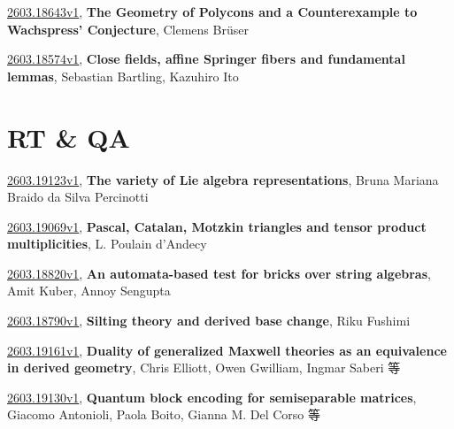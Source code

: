 \documentclass[9pt, a4paper]{article}
\theoremstyle{plain}
\theoremstyle{definition}
\theoremstyle{remark}
\newcommand{\arxiv}[3]{\href{https://arxiv.org/abs/#1}{#1}, \textbf{\textcolor{arxivblue}{#2}}, #3}
\begin{document}
\arxiv{2603.18643v1}{The Geometry of Polycons and a Counterexample to Wachspress' Conjecture}{Clemens Brüser}

\arxiv{2603.18574v1}{Close fields, affine Springer fibers and fundamental lemmas}{Sebastian Bartling, Kazuhiro Ito}


\section{RT \& QA}
\arxiv{2603.19123v1}{The variety of Lie algebra representations}{Bruna Mariana Braido da Silva Percinotti}

\arxiv{2603.19069v1}{Pascal, Catalan, Motzkin triangles and tensor product multiplicities}{L. Poulain d'Andecy}

\arxiv{2603.18820v1}{An automata-based test for bricks over string algebras}{Amit Kuber, Annoy Sengupta}

\arxiv{2603.18790v1}{Silting theory and derived base change}{Riku Fushimi}

\arxiv{2603.19161v1}{Duality of generalized Maxwell theories as an equivalence in derived geometry}{Chris Elliott, Owen Gwilliam, Ingmar Saberi 等}

\arxiv{2603.19130v1}{Quantum block encoding for semiseparable matrices}{Giacomo Antonioli, Paola Boito, Gianna M. Del Corso 等}

\end{document}
